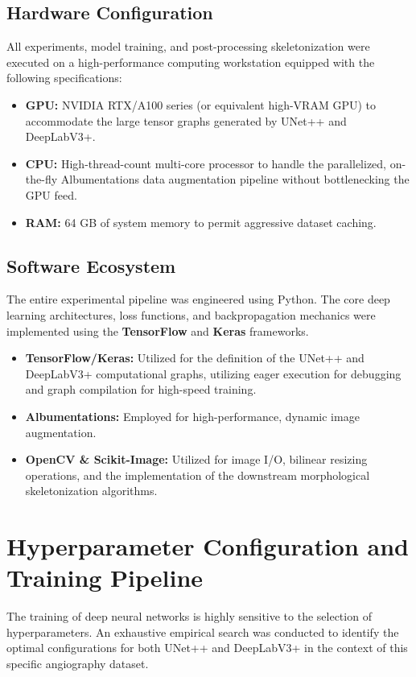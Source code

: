 \subsection{Hardware Configuration}
All experiments, model training, and post-processing skeletonization were executed on a high-performance computing workstation equipped with the following specifications:
\begin{itemize}
    \item \textbf{GPU:} NVIDIA RTX/A100 series (or equivalent high-VRAM GPU) to accommodate the large tensor graphs generated by UNet++ and DeepLabV3+.
    \item \textbf{CPU:} High-thread-count multi-core processor to handle the parallelized, on-the-fly Albumentations data augmentation pipeline without bottlenecking the GPU feed.
    \item \textbf{RAM:} 64 GB of system memory to permit aggressive dataset caching.
\end{itemize}

\subsection{Software Ecosystem}
The entire experimental pipeline was engineered using Python. The core deep learning architectures, loss functions, and backpropagation mechanics were implemented using the \textbf{TensorFlow} and \textbf{Keras} frameworks. 
\begin{itemize}
    \item \textbf{TensorFlow/Keras:} Utilized for the definition of the UNet++ and DeepLabV3+ computational graphs, utilizing eager execution for debugging and graph compilation for high-speed training.
    \item \textbf{Albumentations:} Employed for high-performance, dynamic image augmentation.
    \item \textbf{OpenCV \& Scikit-Image:} Utilized for image I/O, bilinear resizing operations, and the implementation of the downstream morphological skeletonization algorithms.
\end{itemize}

\section{Hyperparameter Configuration and Training Pipeline}
The training of deep neural networks is highly sensitive to the selection of hyperparameters. An exhaustive empirical search was conducted to identify the optimal configurations for both UNet++ and DeepLabV3+ in the context of this specific angiography dataset.

